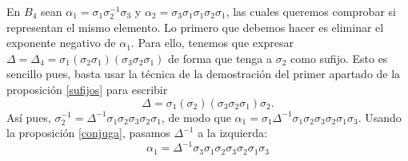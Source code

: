 \documentclass[TFG.tex]{subfiles}
\begin{document}



\begin{ej}\label{ejnormal}
En $B_4$ sean $\alpha_1=\sigma_1\sigma_2^{-1}\sigma_3$ y $\alpha_2=\sigma_3\sigma_1\sigma_1\sigma_2\sigma_1$, las cuales queremos comprobar si representan el mismo elemento. Lo primero que debemos hacer es eliminar el exponente negativo de $\alpha_1$. Para ello, tenemos que expresar $\Delta=\Delta_4=\sigma_1(\sigma_2\sigma_1)(\sigma_3\sigma_2\sigma_1)$ de forma que tenga a $\sigma_2$ como sufijo. Esto es sencillo pues, basta usar la técnica de la demostración del primer apartado de la proposición \ref{sufijos} para escribir
\[
\Delta=\sigma_1(\sigma_2)(\sigma_3\sigma_2\sigma_1)\sigma_2.
\]
Así pues, $\sigma_2^{-1}=\Delta^{-1}\sigma_1\sigma_2\sigma_3\sigma_2\sigma_1$, de modo que $\alpha_1=\sigma_1\Delta^{-1}\sigma_1\sigma_2\sigma_3\sigma_2\sigma_1\sigma_3$. Usando la proposición \ref{conjuga}, pasamos $\Delta^{-1}$ a la izquierda:
\[
\alpha_1=\Delta^{-1}\sigma_3\sigma_1\sigma_2\sigma_3\sigma_2\sigma_1\sigma_3
\]


\end{ej}
\end{document}
